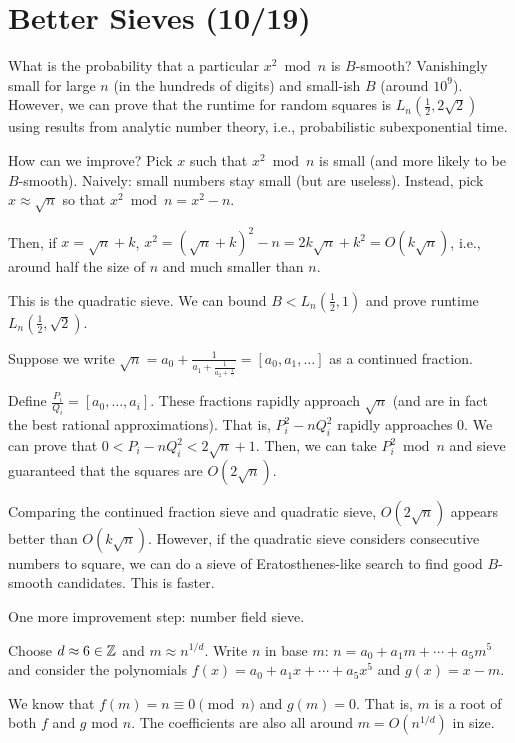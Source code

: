 \documentclass[notes]{agony}
\begin{document}
\section{Better Sieves (10/19)}

What is the probability that a particular $x^2 \bmod n$ is $B$-smooth?
Vanishingly small for large $n$ (in the hundreds of digits)
and small-ish $B$ (around $10^9$).
However, we can prove that the runtime for random squares is $L_n(\frac12,2\sqrt2)$
using results from analytic number theory, i.e., probabilistic subexponential time.

How can we improve?
Pick $x$ such that $x^2 \bmod n$ is small (and more likely to be $B$-smooth).
Naively: small numbers stay small (but are useless).
Instead, pick $x \approx \sqrt{n}$ so that $x^2 \bmod n = x^2 - n$.

Then, if $x = \sqrt{n} + k$, $x^2 = (\sqrt n + k)^2 - n = 2k\sqrt n + k^2
  = O(k\sqrt{n})$, i.e., around half the size of $n$ and much smaller than $n$.

This is the quadratic sieve.
We can bound $B < L_n(\frac12, 1)$ and prove runtime $L_n(\frac12,\sqrt2)$.

Suppose we write $\sqrt{n} = a_0 + \frac{1}{a_1 + \frac{1}{a_2 + \frac{1}{\ddots}}} = [a_0,a_1,\dotsc]$
as a continued fraction.

Define $\frac{P_i}{Q_i} = [a_0,\dotsc,a_i]$.
These fractions rapidly approach $\sqrt{n}$ (and are in fact the best rational approximations).
That is, $P_i^2 - nQ_i^2$ rapidly approaches 0.
We can prove that $0 < P_i - nQ_i^2 < 2\sqrt n + 1$.
Then, we can take $P_i^2 \bmod n$ and sieve guaranteed that the squares are $O(2\sqrt n)$.

Comparing the continued fraction sieve and quadratic sieve,
$O(2\sqrt n)$ appears better than $O(k\sqrt n)$.
However, if the quadratic sieve considers consecutive numbers to square,
we can do a sieve of Eratosthenes-like search to find good $B$-smooth candidates.
This is faster.

One more improvement step: number field sieve.

Choose $d \approx 6 \in \mathbb{Z}$ and $m \approx n^{1/d}$.
Write $n$ in base $m$: $n = a_0 + a_1m + \dotsb + a_5m^5$
and consider the polynomials $f(x) = a_0 + a_1x + \dotsb + a_5 x^5$
and $g(x) = x-m$.

We know that $f(m) = n \equiv 0 \pmod n$ and $g(m) = 0$.
That is, $m$ is a root of both $f$ and $g$ mod $n$.
The coefficients are also all around $m = O(n^{1/d})$ in size.
\end{document}
